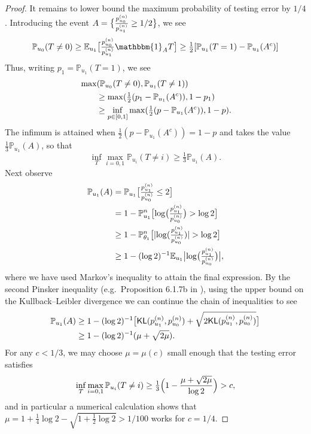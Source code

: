 \documentclass[journal]{IEEEtran}
\newcommand{\1}{\boldsymbol{1}}
\newcommand{\EE}{\mathbb{E}}
\newcommand{\PP}{\mathbb{P}}
\newcommand{\KL}{\mathsf{KL}}
\DeclarePairedDelimiter{\braces}{\{}{\}}
\DeclarePairedDelimiter{\brackets}{(}{)}
\DeclarePairedDelimiter{\sqbrackets}{[}{]}
\DeclarePairedDelimiter{\abs}{\lvert}{\rvert}
\newcommand{\II}{\mathbbm{1}}
\begin{document}
\begin{proof}
	It remains to lower bound the maximum probability of testing error by $1/4$. Introducing the event $A=\braces[\big]{\frac{p_{u_0}^{(n)}}{p_{u_1}^{(n)}}\geq 1/2}$, we see
	\begin{equation*}
		\PP_{u_0}(T\not = 0) \geq  \EE_{u_1}\sqbrackets[\big]{\tfrac{p_{u_0}^{(n)}}{p_{u_1}^{(n)}} \II_A T}
		\geq \tfrac{1}{2}\sqbrackets{ \PP_{u_1}\brackets{T=1}- \PP_{u_1}(A^c)}
	\end{equation*}
	Thus, writing $p_1=\PP_{u_1}(T=1)$, we see
	\begin{align*}
          &\max\brackets{\PP_{u_0}(T\not=0),\PP_{u_1}(T\not =1)}\\
          &\qquad
            \geq \max \brackets{ \tfrac{1}{2}(p_1-\PP_{u_1}(A^c)),1-p_1} \\
          &\qquad\geq \inf_{p\in[0,1]} \max \brackets{ \tfrac{1}{2}(p-\PP_{u_1}(A^c)),1-p}.
        \end{align*}
	The infimum is attained when $\frac{1}{2}(p-\PP_{u_1}(A^c))=1-p$ and takes the value $\frac{1}{3} \PP_{u_1}(A)$, so that
	\begin{equation*}
		\inf_T \max_{i=0,1} \PP_{u_i}(T\neq i) \geq \tfrac{1}{3} \PP_{u_1}(A).
	\end{equation*}
	Next observe
	\begin{align*}
          \PP_{u_1}(A)&= \PP_{u_1}\sqbrackets[\big]{\tfrac{p_{u_1}^{(n)}}{p_{u_0}^{(n)}} \leq  2}\\
          &= 1- \PP_{u_1}^n\sqbrackets[\big]{\log\brackets[\big]{\tfrac{p_{u_1}^{(n)}}{p_{u_0}^{(n)}}}
            >\log 2}\\
          &\geq 1- \PP_{\theta_1}^n\sqbrackets[\big]{\abs{\log(\tfrac{p_{u_1}^{(n)}}{p_{u_0}^{(n)}})}>\log 2} \\ &\geq 1-(\log{2})^{-1} \EE_{u_1} \abs[\big]{\log \brackets[\big]{ \tfrac{p_{u_1}^{(n)}}{p_{u_0}^{(n)}}}},
	\end{align*}
	where we have used Markov's inequality to attain the final expression.
	By the second Pinsker inequality (e.g.\ Proposition 6.1.7b in \cite{GN16}), using the upper bound on the Kullback--Leibler divergence we can continue the chain of inequalities to see
        \begin{align*}
          \PP_{u_1}(A)
          &\geq 1-(\log 2)^{-1}\sqbrackets[\big]{\KL(p_{u_1}^{(n)},p_{u_0}^{(n)}) + \sqrt{2\KL(p_{u_1}^{(n)},p_{u_0}^{(n)})} }\\
          &\geq 1- (\log 2)^{-1} \brackets{\mu +\sqrt{2\mu}}.
        \end{align*}
	For any $c<1/3$, we may choose $\mu=\mu(c)$ small enough that the testing error satisfies \[\inf_T \max_{i=0,1} \PP_{u_i}(T\neq i)\geq \tfrac{1}{3} \brackets[\Big]{1- \frac{\mu+\sqrt{2\mu}}{\log 2}} >c,\] and in particular a numerical calculation shows that $\mu=1+\tfrac{1}{4}\log 2 - \sqrt{1+\tfrac{1}{2}\log 2}>1/100$ works for $c=1/4$.
\end{proof}
\end{document}
